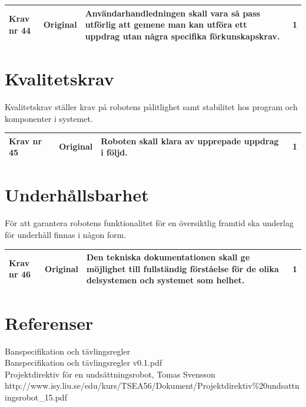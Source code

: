 \documentclass[11pt]{article}
\begin{document}
\begin{flushleft}
\begin{center}
\begin{longtable}{|l|l|p{.70\linewidth}|l|} \hline

Krav nr 44 &
Original &
Användarhandledningen skall vara så pass utförlig att gemene man kan utföra ett uppdrag utan några specifika förkunskapskrav. &
1 \\ \hline

\end{longtable}
\end{center}

\section{Kvalitetskrav}
Kvalitetskrav ställer krav på robotens pålitlighet samt stabilitet hos program och komponenter i systemet.

\begin{center}
\begin{longtable}{|l|l|p{.70\linewidth}|l|} \hline

Krav nr 45 &
Original &
Roboten skall klara av upprepade uppdrag i följd. &
1 \\ \hline

\end{longtable}
\end{center}

\section{Underhållsbarhet}
För att garantera robotens funktionalitet för en översiktlig framtid ska underlag för underhåll finnas i någon form.

\begin{center}
\begin{longtable}{|l|l|p{.70\linewidth}|l|} \hline
Krav nr 46 &
Original &
Den tekniska dokumentationen skall ge möjlighet till fullständig förståelse för de olika delsystemen och systemet som helhet. &
1 \\ \hline

\end{longtable}
\end{center}



\setcounter{secnumdepth}{0}
\pagebreak
\section{Referenser}
Banspecifikation och tävlingsregler \\
Banspecifikation och tävlingsregler v0.1.pdf
\\[0.1in]
Projektdirektiv för en undsättningsrobot, Tomas Svensson
http://www.isy.liu.se/edu/kurs/TSEA56/Dokument/Projektdirektiv\%20undsattningsrobot\_15.pdf

\setcounter{secnumdepth}{2}



\end{flushleft}
\end{document}
